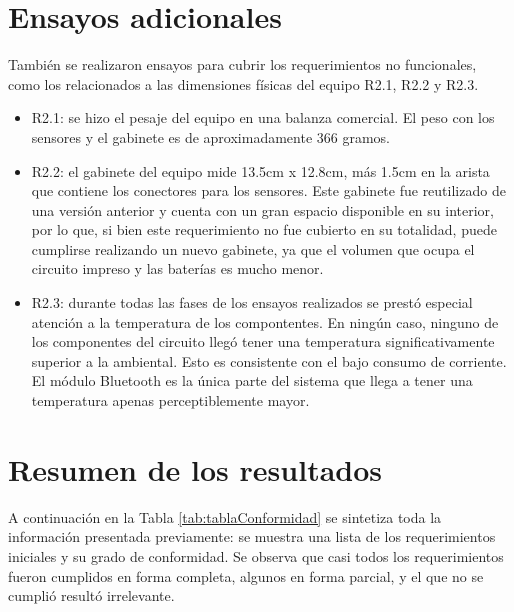 \section{Ensayos adicionales}

También se realizaron ensayos para cubrir los requerimientos no funcionales, como los relacionados a las dimensiones físicas del equipo R2.1, R2.2 y R2.3. 

\begin{itemize}

\item R2.1: se hizo el pesaje del equipo en una balanza comercial. El peso con los sensores y el gabinete es de aproximadamente 366 gramos. 

\item R2.2: el gabinete del equipo mide 13.5cm x 12.8cm, más 1.5cm en la arista que contiene los conectores para los sensores. Este gabinete fue reutilizado de una versión anterior y cuenta con un gran espacio disponible en su interior, por lo que, si bien este requerimiento no fue cubierto en su totalidad, puede cumplirse realizando un nuevo gabinete, ya que el volumen que ocupa el circuito impreso y las baterías es mucho menor.

\item R2.3: durante todas las fases de los ensayos realizados se prestó especial atención a la temperatura de los compontentes. En ningún caso, ninguno de los componentes del circuito llegó tener una temperatura significativamente superior a la ambiental. Esto es consistente con el bajo consumo de corriente. El módulo Bluetooth es la única parte del sistema que llega a tener una temperatura apenas perceptiblemente mayor. 


\end{itemize}

\section{Resumen de los resultados} \label{resumenResultados}

A continuación en la Tabla \ref{tab:tablaConformidad} se sintetiza toda la información presentada previamente: se muestra una lista de los requerimientos iniciales y su grado de conformidad. Se observa que casi todos los requerimientos fueron cumplidos en forma completa, algunos en forma parcial, y el que no se cumplió resultó irrelevante.

\pagebreak

